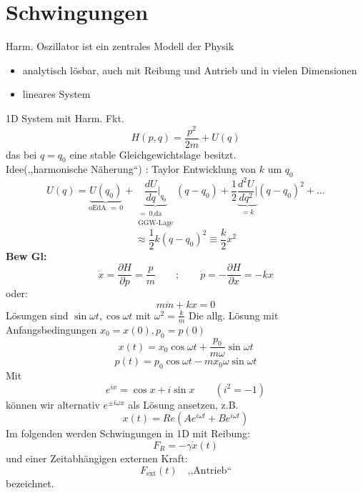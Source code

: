 \documentclass[titlepage,12pt,a4paper,ngerman]{report}
\newcommand{\tx}[1]{\textrm{#1}}
\begin{document}
\section{Schwingungen}
Harm. Oszillator ist ein zentrales Modell der Physik
\begin{itemize}
	\item analytisch lösbar, auch mit Reibung und Antrieb und in vielen Dimensionen
	\item lineares System
\end{itemize}

1D System mit Harm. Fkt.
$$ H(p,q) = \frac{p^2}{2m} + U(q)$$
das bei $q = q_0$ eine stable Gleichgewichtslage besitzt.\\
Idee(,,harmonische Näherung``) : Taylor Entwicklung von $k$ um $q_0$
$$U(q) = \underbrace{U(q_0)}_{\textrm{oEdA } =\  0} + \underbrace{\frac{dU}{dq} \bigg|_{q_0}}_{\substack{ =\  0 \tx{,da}\\ \textrm{GGW-Lage}}} (q-q_0) + \frac{1}{2} \underbrace{ \frac{d^2 U}{d q^2} \bigg|}_{= k} (q-q_0)^2 + \dots$$
$$\approx \frac{1}{2} k (q-q_0)^2 \equiv \frac{k}{2} x^2$$
\textbf{Bew Gl:} 
$$ \dot{x} = \frac{\partial H}{\partial p }= \frac{p}{m} \qquad; \qquad \dot{p} = - \frac{\partial H}{\partial x} = -kx$$
oder: $$ m\ddot{m} + kx = 0$$
Lösungen sind $\sin \omega t, \cos \omega t$ mit $\omega^2 = \frac{k}{m}$
Die allg. Lösung mit Anfangsbedingungen $x_0 = x(0) , p_0 = p(0)$
$$x(t) = x_0 \cos \omega t + \frac{p_0}{m \omega} \sin \omega t$$
$$p(t) = p_0 \cos \omega t - m x_0 \omega \sin \omega t$$
Mit $$ e^{ix} = \cos x + i \sin x \qquad (i^2 = -1)$$
können wir alternativ $ e^{\pm i \omega x} $ als Lösung ansetzen, z.B.
$$x(t) = Re(A e^{i\omega t} + B e^{i\omega t} )$$
Im folgenden werden Schwingungen in 1D mit Reibung:
$$ F_R = -\gamma \dot{x}(t)$$
und einer Zeitabhängigen externen Kraft:
$$F_{\tx{ext}}(t) \quad \textrm{,,Antrieb``}$$
bezeichnet.
\end{document}
